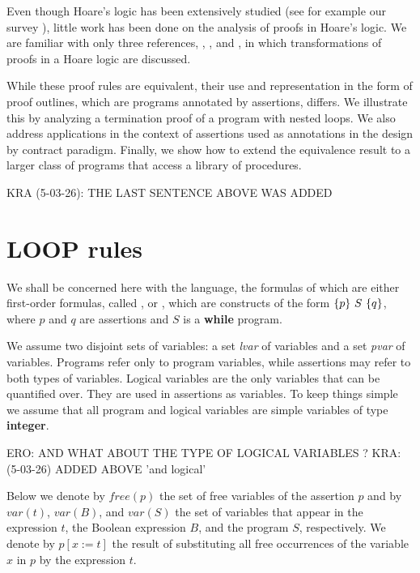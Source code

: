 \documentclass[runningheads]{llncs}       %
\begin{document}
Even though Hoare's logic has been extensively studied (see for
example our survey \cite{AO19}), little work has been done on the
analysis of proofs in Hoare's logic. We are familiar with only three
references, \cite{Apt81a}, \cite{GR16}, and \cite{Tiu02}, in which
transformations of proofs in a Hoare logic are discussed.

While these proof rules are equivalent, their use and representation
in the form of proof outlines, which are programs annotated by
assertions, differs. We illustrate this by analyzing a termination
proof of a program with nested loops. We also address applications in
the context of assertions used as annotations in the design by
contract paradigm.
Finally, we show how to extend the equivalence result to a larger class of programs
that access a library of procedures.

\III

\NI
KRA (5-03-26): THE LAST SENTENCE ABOVE WAS ADDED

\section{LOOP rules}

We shall be concerned here with the language, the formulas of
which are either first-order formulas, called , or
, which are constructs of the form $\mbox{$\{{p}\}\ {S}\ \{{q}\}$}$,
where $p$ and $q$ are assertions and $S$ is a \textbf{while} program.

We assume two disjoint sets of variables: a set \emph{lvar} of
 variables and a set \emph{pvar} of 
variables. Programs refer only to program variables, while assertions
may refer to both types of variables.  Logical variables are the only
variables that can be quantified over. They are used in assertions as
 variables.
To keep things simple we assume that all program and logical variables
are simple variables of  type \textbf{integer}.

ERO: AND WHAT ABOUT THE TYPE OF LOGICAL VARIABLES ?
KRA: (5-03-26) ADDED ABOVE 'and logical'
\III

Below we denote by $\mathit{free}(p)$
the set of free variables of the assertion $p$ and by $var(t)$, $var(B)$, and $var(S)$ 
the set of variables that appear in the
expression $t$, the Boolean expression $B$, and the program $S$, respectively.
%
% 
%
We denote by $p[x:=t]$ the result of substituting all free occurrences
of the variable $x$ in $p$ by the expression $t$. 
\end{document}
